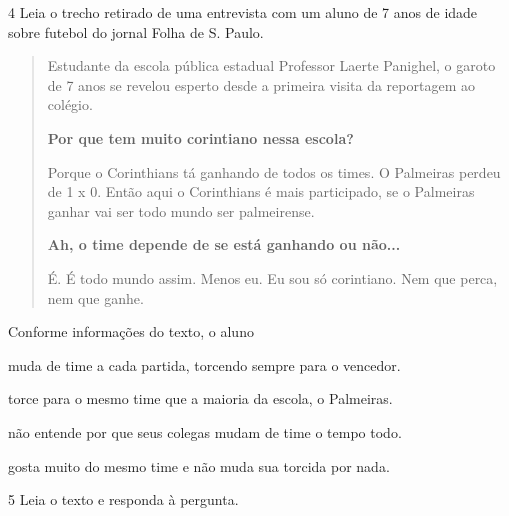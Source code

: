 \pagebreak
\num{4} Leia o trecho retirado de uma entrevista com um aluno de 7 anos
de idade sobre futebol do jornal Folha de S. Paulo.

\begin{quote}
Estudante da escola pública estadual Professor Laerte Panighel, o garoto
de 7 anos se revelou esperto desde a primeira visita da reportagem ao
colégio.

\textbf{Por que tem muito corintiano nessa escola?}

Porque o Corinthians tá ganhando de todos os times. O Palmeiras perdeu
de 1 x 0. Então aqui o Corinthians é mais participado, se o
Palmeiras ganhar vai ser todo mundo ser palmeirense.

\textbf{Ah, o time depende de se está ganhando ou não...}

É. É todo mundo assim. Menos eu. Eu sou só corintiano. Nem que perca,
nem que ganhe.

\end{quote}

Conforme informações do texto, o aluno

\begin{escolha}
\item muda de time a cada partida, torcendo sempre para o vencedor.

\item torce para o mesmo time que a maioria da escola, o Palmeiras.

\item não entende por que seus colegas mudam de time o tempo todo.

\item gosta muito do mesmo time e não muda sua torcida por nada.
\end{escolha}



\num{5} Leia o texto e responda à pergunta.

